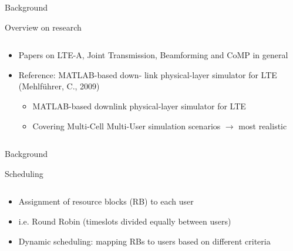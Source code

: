 \documentclass[xcolor={cmyk}]{beamer}
\begin{document}
 \begin{frame}{Background}
	 \begin{block}{Overview on research}
	 	\begin{columns}
			\begin{column}{.9\textwidth}
				\begin{itemize}
					\item Papers on LTE-A, Joint Transmission, Beamforming and CoMP in general
					\item Reference: MATLAB-based down-
link physical-layer simulator for LTE (Mehlführer, C., 2009)
					\begin{itemize}
						\item MATLAB-based downlink physical-layer simulator for LTE
						\item Covering Multi-Cell Multi-User simulation scenarios $\rightarrow$ most realistic
					\end{itemize}
				\end{itemize}
			\end{column}
		\end{columns}
	 \end{block}
 \end{frame}
 
 
 \begin{frame}{Background}
 	\begin{block}{Scheduling}
		\begin{columns}
			\begin{column}{.9\textwidth}
				\begin{itemize}
					\item Assignment of resource blocks (RB) to each user
					\item i.e. Round Robin (timeslots divided equally between users)
					\item Dynamic scheduling: mapping RBs to users based on different criteria
				\end{itemize}
			\end{column}
		\end{columns}
	 \end{block}
 \end{frame}
\end{document}
